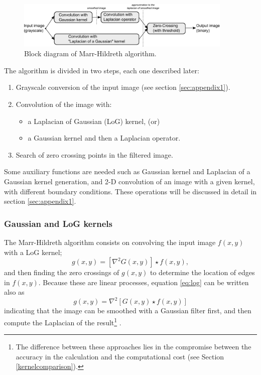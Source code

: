 \documentclass{ipol}
\numberwithin{equation}{section}
\numberwithin{table}{section}
\begin{document}
\begin{figure}[!b]
	\centering
	\includegraphics[width=0.92\textwidth]{blockdiagram2.pdf}
	\caption{Block diagram of Marr-Hildreth algorithm.}
	\label{fig:blockdiagram2}
\end{figure}

The algorithm is divided in two steps, each one described later:
\begin{enumerate}
	\item Grayscale conversion of the input image (see section \ref{sec:appendix1}).
	\item Convolution of the image with:
	\begin{itemize}
		\item a Laplacian of Gaussian (LoG) kernel, (or)
		\item a Gaussian kernel and then a Laplacian operator.
	\end{itemize}
	\item Search of zero crossing points in the filtered image.
\end{enumerate}

Some auxiliary functions are needed such as Gaussian kernel and Laplacian of a Gaussian 
kernel generation, and 2-D convolution of an image with a given kernel, 
with different boundary conditions. These operations will be discussed 
in detail in section \ref{sec:appendix1}.


\subsubsection{Gaussian and LoG kernels}

The Marr-Hildreth algorithm consists on convolving the input image $f(x,y)$ with a LoG kernel;
\begin{equation}\label{eq:log}
  g(x,y) = [\nabla^2G(x,y)]\star f(x,y), 
\end{equation}
and then finding the zero crossings of $g(x,y)$ to determine the location of edges in $f(x,y)$. 
Because these are linear processes, equation \ref{eq:log} can be written also as
\begin{equation}
  g(x,y) = \nabla^2[G(x,y)\star f(x,y)]
\end{equation}
indicating that the image can be smoothed with a Gaussian filter first, and then compute the Laplacian of the result\footnote{The difference between these approaches lies in the compromise between the accuracy in the calculation and the computational cost (see Section \ref{kernelcomparison}).} .
\end{document}
